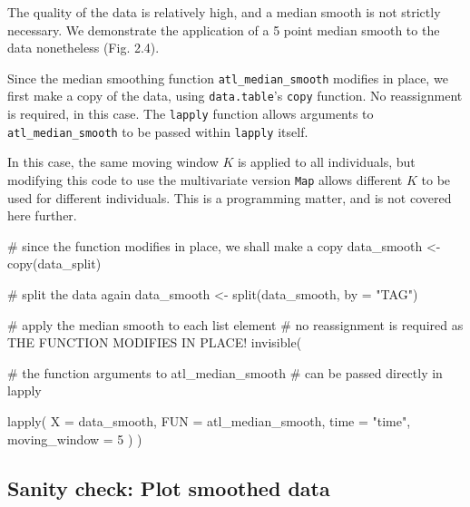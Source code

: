 \documentclass[]{scrreprt}
\newenvironment{Shaded}{}{}
\newcommand{\CommentTok}[1]{\textcolor[rgb]{0.00,0.50,0.00}{#1}}
\newcommand{\DataTypeTok}[1]{#1}
\newcommand{\DecValTok}[1]{#1}
\newcommand{\KeywordTok}[1]{\textcolor[rgb]{0.00,0.00,1.00}{#1}}
\newcommand{\NormalTok}[1]{#1}
\newcommand{\StringTok}[1]{\textcolor[rgb]{0.00,0.50,0.50}{#1}}
\begin{document}
The quality of the data is relatively high, and a median smooth is not strictly necessary. We demonstrate the application of a 5 point median smooth to the data nonetheless (Fig. 2.4).

Since the median smoothing function \texttt{atl\_median\_smooth} modifies in place, we first make a copy of the data, using \texttt{data.table}'s \texttt{copy} function.
No reassignment is required, in this case. The \texttt{lapply} function allows arguments to \texttt{atl\_median\_smooth} to be passed within \texttt{lapply} itself.

In this case, the same moving window \(K\) is applied to all individuals, but modifying this code to use the multivariate version \texttt{Map} allows different \(K\) to be used for different individuals. This is a programming matter, and is not covered here further.

\begin{Shaded}
\begin{Highlighting}[]
\CommentTok{# since the function modifies in place, we shall make a copy}
\NormalTok{data_smooth <-}\StringTok{ }\KeywordTok{copy}\NormalTok{(data_split)}

\CommentTok{# split the data again}
\NormalTok{data_smooth <-}\StringTok{ }\KeywordTok{split}\NormalTok{(data_smooth, }\DataTypeTok{by =} \StringTok{"TAG"}\NormalTok{)}
\end{Highlighting}
\end{Shaded}

\begin{Shaded}
\begin{Highlighting}[]
\CommentTok{# apply the median smooth to each list element}
\CommentTok{# no reassignment is required as THE FUNCTION MODIFIES IN PLACE!}
\KeywordTok{invisible}\NormalTok{(}

  \CommentTok{# the function arguments to atl_median_smooth}
  \CommentTok{# can be passed directly in lapply}

  \KeywordTok{lapply}\NormalTok{(}
    \DataTypeTok{X =}\NormalTok{ data_smooth,}
    \DataTypeTok{FUN =}\NormalTok{ atl_median_smooth,}
    \DataTypeTok{time =} \StringTok{"time"}\NormalTok{, }\DataTypeTok{moving_window =} \DecValTok{5}
\NormalTok{  )}
\NormalTok{)}
\end{Highlighting}
\end{Shaded}

\hypertarget{sanity-check-plot-smoothed-data}{%
\subsection{Sanity check: Plot smoothed data}\label{sanity-check-plot-smoothed-data}}
\end{document}
